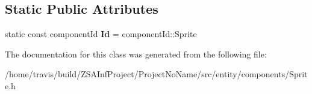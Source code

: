 \subsection*{Static Public Attributes}
\begin{DoxyCompactItemize}
\item 
\hypertarget{classSpriteComponent_acc8a12da18e2b079a0364ab7c9c64a97}{static const component\-Id {\bfseries Id} = component\-Id\-::\-Sprite}\label{classSpriteComponent_acc8a12da18e2b079a0364ab7c9c64a97}

\end{DoxyCompactItemize}


The documentation for this class was generated from the following file\-:\begin{DoxyCompactItemize}
\item 
/home/travis/build/\-Z\-S\-A\-Inf\-Project/\-Project\-No\-Name/src/entity/components/Sprite.\-h\end{DoxyCompactItemize}
